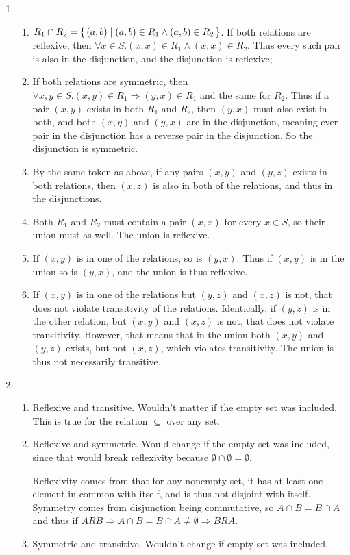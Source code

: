 \documentclass{article}
\begin{document}
\begin{enumerate}
    \item
        \begin{enumerate}
            \item $R_1 \cap R_2 = \set{(a,b) \mid (a,b) \in R_1 \land (a,b) \in R_2}$. If both relations are reflexive, then $\forall x \in S . (x,x) \in R_1 \land (x,x) \in R_2$. Thus every such pair is also in the disjunction, and the disjunction is reflexive;
        \item If both relations are symmetric, then $\forall x,y \in S. (x,y) \in R_1 \Rightarrow (y,x) \in R_1$ and the same for $R_2$.
            Thus if a pair $(x,y)$ exists in both $R_1$ and $R_2$, then $(y,x)$ must also exist in both, and both $(x,y)$ and $(y,x)$ are in the disjunction, meaning ever pair in the disjunction has a reverse pair in the disjunction. So the disjunction is symmetric.
        \item By the same token as above, if any pairs $(x,y)$ and $(y,z)$ exists in both relations, then $(x,z)$ is also in both of the relations, and thus in the disjunctions.
        \item Both $R_1$ and $R_2$ must contain a pair $(x,x)$ for every $x \in S$, so their union must as well. The union is reflexive.
        \item If $(x,y)$ is in one of the relations, so is $(y,x)$. Thus if $(x,y)$ is in the union so is $(y,x)$, and the union is thus reflexive.
        \item If $(x,y)$ is in one of the relations but $(y,z)$ and $(x,z)$ is not, that does not violate transitivity of the relations. Identically, if $(y,z)$ is in the other relation, but $(x,y)$ and $(x,z)$ is not, that does not violate transitivity. However, that means that in the union both $(x,y)$ and $(y,z)$ exists, but not $(x,z)$, which violates transitivity. The union is thus not necessarily transitive.
        \end{enumerate}

    \item
        \begin{enumerate}
            \item Reflexive and transitive. Wouldn't matter if the empty set was included. This is true for the relation $\subseteq$ over any set.
            \item Reflexive and symmetric. Would change if the empty set was included, since that would break reflexivity because $\emptyset \cap \emptyset = \emptyset$.

                Reflexivity comes from that for any nonempty set, it has at least one element in common with itself, and is thus not disjoint with itself. Symmetry comes from disjunction being commutative, so $A \cap B = B \cap A$ and thus if $A R B \Rightarrow A \cap B = B \cap A \neq \emptyset \Rightarrow B R A$.
            \item Symmetric and transitive. Wouldn't change if empty set was included.


\end{enumerate}
\end{enumerate}
\end{document}
